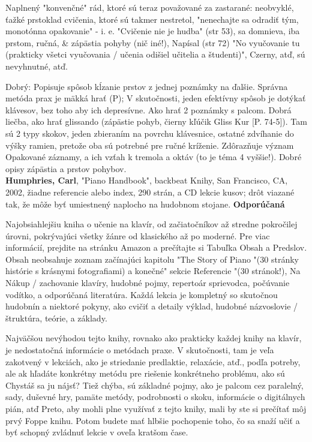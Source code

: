 \documentclass[11pt,a4paper%
]{article}
\begin{document}
Naplnený "konvenčné" rád, ktoré sú teraz považované za zastarané: neobvyklé, ťažké prstoklad cvičenia, ktoré sú takmer nestretol, "nenechajte sa odradiť tým, monotónna opakovanie" - i. e. "Cvičenie nie je hudba" (str 53), sa domnieva, iba prstom, ručná, \& zápästia pohyby (nič iné!), Napísal (str 72) "No vyučovanie tu (prakticky všetci vyučovania / učenia odišiel učitelia a študenti)", Czerny, atď, sú nevyhnutné, atď.

Dobrý: Popisuje spôsob kĺzanie prstov z jednej poznámky na ďalšie. Správna metóda prax je mäkká hrať (P); V skutočnosti, jeden efektívny spôsob je dotýkať klávesov, bez toho aby ich depresívne. Ako hrať 2 poznámky s palcom. Dobrá liečba, ako hrať glissando (zápästie pohyb, čierny kľúčik Gliss Kur [P. 74-5]). Tam sú 2 typy skokov, jeden zbieraním na povrchu klávesnice, ostatné zdvíhanie do výšky ramien, pretože oba sú potrebné pre ručné kríženie. Zdôrazňuje význam Opakované záznamy, a ich vzťah k tremola a oktáv (to je téma 4 vyššie!). Dobré opisy zápästia a prstov pohybov.
\medskip\\
\textbf{Humphries, Carl}, "Piano Handbook", backbeat Knihy, San Francisco, CA, 2002, žiadne referencie alebo index, 290 strán, a CD lekcie kusov; drôt viazané tak, že môže byť umiestnený naplocho na hudobnom stojane. \textbf{Odporúčaná}

Najobsiahlejšiu kniha o učenie na klavír, od začiatočníkov až stredne pokročilej úrovni, pokrývajúci všetky žánre od klasického až po moderné. Pre viac informácií, prejdite na stránku Amazon a prečítajte si Tabuľka Obsah a Predslov. Obsah neobsahuje zoznam začínajúci kapitolu "The Story of Piano "(30 stránky histórie s krásnymi fotografiami) a konečné" sekcie Referencie "(30 stránok!), Na Nákup / zachovanie klavíry, hudobné pojmy, repertoár sprievodca, počúvanie vodítko, a odporúčaná literatúra. Každá lekcia je kompletný so skutočnou hudobnín a niektoré pokyny, ako cvičiť a detaily výklad, hudobné názvoslovie / štruktúra, teórie, a základy.

Najväčšou nevýhodou tejto knihy, rovnako ako prakticky každej knihy na klavír, je nedostatočná informácie o metódach praxe. V skutočnosti, tam je veľa zakotvený v lekciách, ako je striedanie predlaktie, relaxácie, atď., podľa potreby, ale ak hľadáte konkrétny metódu pre riešenie konkrétneho problému, ako sú Chystáš sa ju nájsť? Tiež chýba, sú základné pojmy, ako je palcom cez paralelný, sady, duševné hry, pamäte metódy, podrobnosti o skoku, informácie o digitálnych pián, atď Preto, aby mohli plne využívať z tejto knihy, mali by ste si prečítať môj prvý Foppe knihu. Potom budete mať hlbšie pochopenie toho, čo sa snaží učiť a byť schopný zvládnuť lekcie v oveľa kratšom čase.
\end{document}
